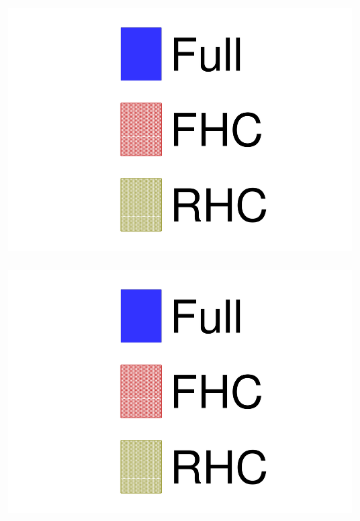 \begin{figure}[h]
	\begin{subfigure}[t]{0.32\textwidth}
		\includegraphics[width=\textwidth, trim={0mm 0mm 0mm 0mm}, clip, page=4]{figures/mach3/data/alt/try_2017_fit_on_sk_spectra_posterior_sk_error_run2to4_spectra_posterior_sk_error_run5to6_spectra}
	\end{subfigure}
	\begin{subfigure}[t]{0.32\textwidth}
		\includegraphics[width=\textwidth, trim={0mm 0mm 0mm 0mm}, clip, page=5]{figures/mach3/data/alt/try_2017_fit_on_sk_spectra_posterior_sk_error_run2to4_spectra_posterior_sk_error_run5to6_spectra}
	\end{subfigure}
	\begin{subfigure}[t]{0.32\textwidth}

\end{subfigure}
\end{figure}
